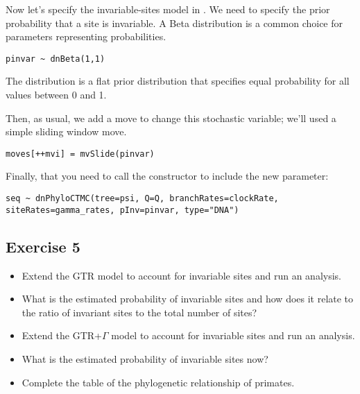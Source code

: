 Now let's specify the invariable-sites model in \RevBayes.
We need to specify the prior probability that a site is invariable.
A Beta distribution is a common choice for parameters representing probabilities.
{\tt \begin{snugshade*}
\begin{lstlisting}
pinvar ~ dnBeta(1,1)
\end{lstlisting}
\end{snugshade*}}
The  distribution is a flat prior distribution that specifies equal probability for all values between 0 and 1.

Then, as usual, we add a move to change this stochastic variable; we'll used a simple sliding window move.
{\tt \begin{snugshade*}
\begin{lstlisting}
moves[++mvi] = mvSlide(pinvar)
\end{lstlisting}
\end{snugshade*}}

Finally, that you need to call the  constructor to include the new parameter:
{\tt \begin{snugshade*}
\begin{lstlisting}
seq ~ dnPhyloCTMC(tree=psi, Q=Q, branchRates=clockRate, siteRates=gamma_rates, pInv=pinvar, type="DNA")
\end{lstlisting}
\end{snugshade*}}

\subsection{Exercise 5}

\begin{itemize}
\item Extend the GTR model to account for invariable sites and run an analysis.
\item What is the estimated probability of invariable sites and how does it relate to the ratio of invariant sites to the total number of sites?
\item Extend the GTR+$\Gamma$ model to account for invariable sites and run an analysis.
\item What is the estimated probability of invariable sites now?
\item Complete the table of the phylogenetic relationship of primates.
\end{itemize} 




